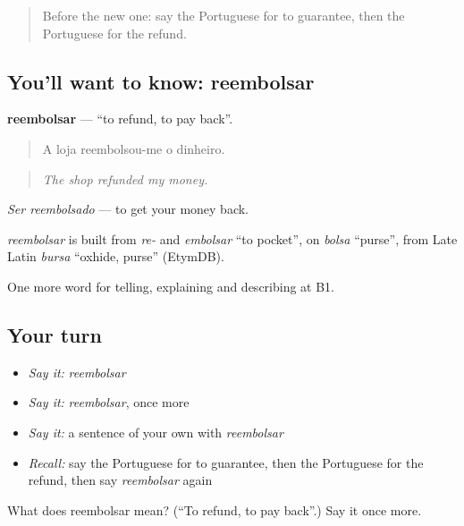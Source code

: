\begin{quote}
Before the new one: say the Portuguese for to guarantee, then the Portuguese for the refund.
\end{quote}

\subsection*{You'll want to know: reembolsar}
\textbf{reembolsar} — \textquotedblleft{}to refund, to pay back\textquotedblright{}.

\begin{quote}
A loja reembolsou-me o dinheiro.
\end{quote}

\begin{quote}
\emph{The shop refunded my money.}
\end{quote}

\emph{Ser reembolsado} — to get your money back.

\begin{cousinweb}
\emph{reembolsar} is built from \emph{re-} and \emph{embolsar} \textquotedblleft{}to pocket\textquotedblright{}, on \emph{bolsa} \textquotedblleft{}purse\textquotedblright{}, from Late Latin \emph{bursa} \textquotedblleft{}oxhide, purse\textquotedblright{} (EtymDB).
\end{cousinweb}

\begin{grammarlens}[title={What you've built}]
One more word for telling, explaining and describing at B1.
\end{grammarlens}

\subsection*{Your turn}
\begin{itemize}
\raggedright
  \item \emph{Say it:} \emph{reembolsar}
  \item \emph{Say it:} \emph{reembolsar}, once more
  \item \emph{Say it:} a sentence of your own with \emph{reembolsar}
  \item \emph{Recall:} say the Portuguese for to guarantee, then the Portuguese for the refund, then say \emph{reembolsar} again
\end{itemize}

\begin{tcolorbox}[breakable,colback=teal!4,colframe=teal!35!black,title={Before you move on}]
What does reembolsar mean? (\textquotedblleft{}To refund, to pay back\textquotedblright{}.) Say it once more.
\end{tcolorbox}
